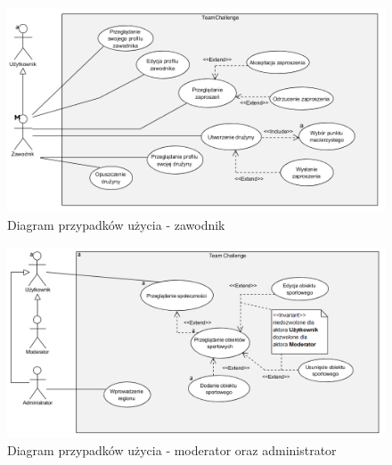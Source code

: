 \begin{figure}[H]
\centering
\includegraphics[width=0.6\linewidth]{04-projekt/rys/usecase2.PNG}
\caption{Diagram przypadków użycia - zawodnik}
\label{fig:diagram-trad-alg-opt}
\end{figure}

\begin{figure}[H]
\centering
\includegraphics[width=\linewidth]{04-projekt/rys/usecase4.PNG}
\caption{Diagram przypadków użycia - moderator oraz administrator}
\label{fig:diagram-trad-alg-opt}
\end{figure}

